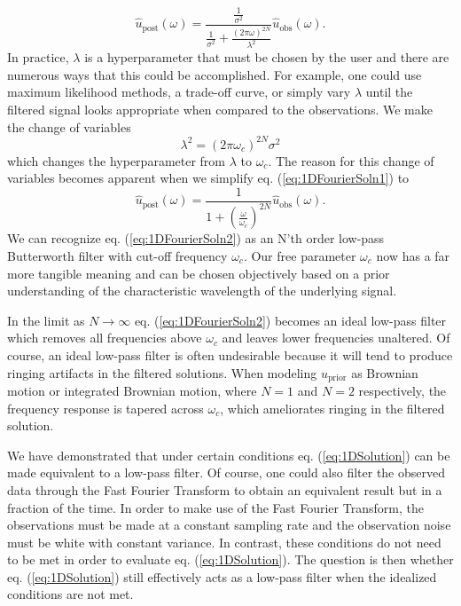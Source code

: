\documentclass[10pt,a4paper]{article}
\begin{document}
\begin{equation}\label{eq:1DFourierSoln1}
\hat{u}_\mathrm{post}(\omega) = \frac{\frac{1}{\sigma^2}}
                                  {\frac{1}{\sigma^2} +                  
                                  \frac{(2\pi\omega)^{2N}}{\lambda^2}}
                                  \hat{u}_\mathrm{obs}(\omega).
\end{equation}
In practice, $\lambda$ is a hyperparameter that must be chosen by the user and there are numerous ways that this could be accomplished.  For example, one could use maximum likelihood methods, a trade-off curve, or simply vary $\lambda$ until the filtered signal looks appropriate when compared to the observations.  We make the change of variables 
\begin{equation}\label{eq:VariableChange}
\lambda^2 = (2\pi\omega_c)^{2N}\sigma^2
\end{equation}
which changes the hyperparameter from $\lambda$ to $\omega_c$.  The reason for this change of variables becomes apparent when we simplify eq. (\ref{eq:1DFourierSoln1}) to
\begin{equation}\label{eq:1DFourierSoln2}
\hat{u}_\mathrm{post}(\omega) = \frac{1}
                                  {1 + \left(\frac{\omega}{\omega_c}\right)^{2N}}
                                  \hat{u}_\mathrm{obs}(\omega).        
\end{equation}
We can recognize eq. (\ref{eq:1DFourierSoln2}) as an N'th order low-pass Butterworth filter with cut-off frequency $\omega_c$.  Our free parameter $\omega_c$ now has a far more tangible meaning and can be chosen objectively based on a prior understanding of the characteristic wavelength of the underlying signal.  

In the limit as $N\to \infty$ eq. (\ref{eq:1DFourierSoln2}) becomes an ideal low-pass filter which removes all frequencies above $\omega_c$ and leaves lower frequencies unaltered.  Of course, an ideal low-pass filter is often undesirable because it will tend to produce ringing artifacts in the filtered solutions.  When modeling $u_\mathrm{prior}$ as Brownian motion or integrated Brownian motion, where $N=1$ and $N=2$ respectively, the frequency response is tapered across $\omega_c$, which ameliorates ringing in the filtered solution.

We have demonstrated that under certain conditions eq. (\ref{eq:1DSolution}) can be made equivalent to a low-pass filter.  Of course, one could also filter the observed data through the Fast Fourier Transform to obtain an equivalent result but in a fraction of the time.  In order to make use of the Fast Fourier Transform, the observations must be made at a constant sampling rate and the observation noise must be  white with constant variance.  In contrast, these conditions do not need to be met in order to evaluate eq. (\ref{eq:1DSolution}).  The question is then whether eq. (\ref{eq:1DSolution}) still effectively acts as a low-pass filter when the idealized conditions are not met.  
\end{document}
